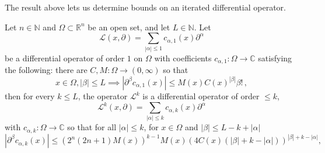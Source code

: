 \documentclass[
	fontsize=11pt, 
	twoside=false, 
	abstract=true, 
	a4paper,
]{scrartcl}
\newcommand{\RR}{\mathbb{R}}
\newcommand{\CC}{\mathbb{C}}
\newcommand{\abs}[1]{\left\lvert#1\right\rvert}
\newcommand{\del}{\partial}
\begin{document}
The result above lets us determine bounds on an iterated differential operator.
\begin{lemma}\label{lem:inducops}
	Let $n\in\mathbb{N}$ and $\Omega \subset \RR^n$ be an open set, and let $L\in \mathbb{N}$. Let 
	\[
		\mathcal{L}(x,\del) = \sum_{\abs{\alpha}\leq 1} c_{\alpha,1}(x)\del^\alpha
	\]
	be a differential operator of order $1$ on $\Omega$ with coefficients $c_{\alpha,1} \colon \Omega\to \CC$ satisfying the following: there are $C,M\colon \Omega \to (0,\infty)$ so that
	\begin{equation}\label{eq:firstc}
		x\in\Omega, \abs{\beta}\leq L\implies \abs{\del^\beta c_{\alpha,1}(x)} \leq M(x) C(x)^{\abs{\beta}}\beta!\,,
	\end{equation}
	then for every $k\leq L$, the operator $\mathcal{L}^k$ is a differential operator of order $\leq k$, 
	\[
		\mathcal{L}^k(x,\del) = \sum_{\abs{\alpha}\leq k} c_{\alpha,k}(x)\del^\alpha
	\]
	with $c_{\alpha,k} \colon \Omega\to \CC$ so that for all $\abs{\alpha}\leq k$, for $x\in\Omega$ and $\abs{\beta} \leq L-k+\abs{\alpha}$
	\begin{equation}\label{eq:inducknew}
		\abs{\del^\beta c_{\alpha,k}(x)} \leq (2^n(2n+1) M(x))^{k-1} M(x) (4C(x)(\abs{\beta}+k-\abs{\alpha}))^{\abs{\beta}+k-\abs{\alpha}},
	\end{equation}
\end{lemma}
\end{document}
